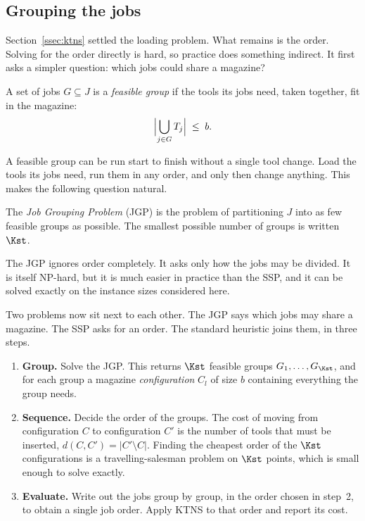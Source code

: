 
\subsection{Grouping the jobs}\label{ssec:jgp}

Section~\ref{ssec:ktns} settled the loading problem. What remains is the order.
Solving for the order directly is hard, so practice does something indirect. It
first asks a simpler question: which jobs could share a magazine?

\begin{definition}\label{def:group}
A set of jobs $G \subseteq J$ is a \emph{feasible group} if the tools its jobs
need, taken together, fit in the magazine:
\[
  \Bigl\lvert \bigcup_{j \in G} T_j \Bigr\rvert \;\le\; b .
\]
\end{definition}

A feasible group can be run start to finish without a single tool change. Load
the tools its jobs need, run them in any order, and only then change anything.
This makes the following question natural.

\begin{definition}\label{def:jgp}
The \emph{Job Grouping Problem} (JGP) is the problem of partitioning $J$ into as
few feasible groups as possible. The smallest possible number of groups is
written $\Kst$.
\end{definition}

The JGP ignores order completely. It asks only how the jobs may be divided. It is
itself NP-hard, but it is much easier in practice than the SSP, and it can be
solved exactly on the instance sizes considered here.

Two problems now sit next to each other. The JGP says which jobs may share a
magazine. The SSP asks for an order. The standard heuristic joins them, in three
steps.

\begin{enumerate}[topsep=4pt,itemsep=2pt]
  \item \textbf{Group.} Solve the JGP. This returns $\Kst$ feasible groups
  $G_1,\dots,G_{\Kst}$, and for each group a magazine \emph{configuration}
  $C_l$ of size $b$ containing everything the group needs.
  \item \textbf{Sequence.} Decide the order of the groups. The cost of moving
  from configuration $C$ to configuration $C'$ is the number of tools that must
  be inserted, $d(C,C') = \lvert C' \setminus C \rvert$. Finding the cheapest
  order of the $\Kst$ configurations is a travelling-salesman problem on $\Kst$
  points, which is small enough to solve exactly.
  \item \textbf{Evaluate.} Write out the jobs group by group, in the order chosen
  in step~2, to obtain a single job order. Apply KTNS to that order and report
  its cost.
\end{enumerate}

